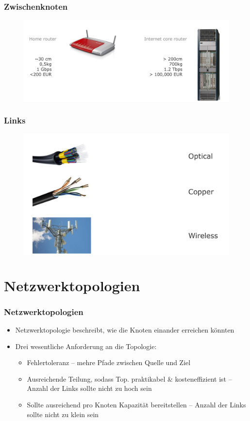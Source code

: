 \documentclass[xcolor=dvipsnames, aspectratio=169]{beamer}
\begin{document}
\begin{frame}
	\frametitle{Zwischenknoten}
	\begin{figure}
		\includegraphics[scale=0.15]{zwischenknoten}
	\end{figure}
\end{frame}

\begin{frame}
	\frametitle{Links}
	\begin{figure}
		\includegraphics[scale=0.15]{links}
	\end{figure}
\end{frame}

\section{Netzwerktopologien}
\begin{frame}
	\frametitle{Netzwerktopologien}
	\begin{itemize}
		\item Netzwerktopologie beschreibt, wie die Knoten einander erreichen könnten
		\item Drei wesentliche Anforderung an die Topologie:
		\begin{itemize}
			\item Fehlertoleranz -- mehre Pfade zwischen Quelle und Ziel
			\item Ausreichende Teilung, sodass Top. praktikabel \& kosteneffizient ist -- Anzahl der Links sollte nicht zu hoch sein
			\item Sollte ausreichend pro Knoten Kapazität bereitstellen -- Anzahl der Links sollte nicht zu klein sein
		\end{itemize}
	\end{itemize}
\end{frame}
\end{document}
